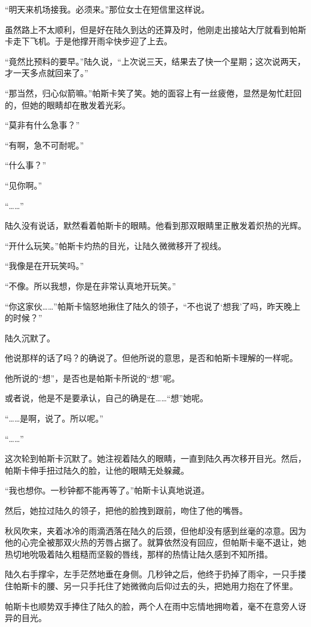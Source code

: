 “明天来机场接我。必须来。”那位女士在短信里这样说。

虽然路上不太顺利，但是好在陆久到达的还算及时，他刚走出接站大厅就看到帕斯卡走下飞机。于是他撑开雨伞快步迎了上去。

“竟然比预料的要早。”陆久说，“上次说三天，结果去了快一个星期；这次说两天，才一天多点就回来了。”

“那当然，归心似箭嘛。”帕斯卡笑了笑。她的面容上有一丝疲倦，显然是匆忙赶回的，但她的眼睛却在散发着光彩。

“莫非有什么急事？”

“有啊，急不可耐呢。”

“什么事？”

“见你啊。”

“……”

陆久没有说话，默然看着帕斯卡的眼睛。他看到那双眼睛里正散发着炽热的光辉。

“开什么玩笑。”帕斯卡灼热的目光，让陆久微微移开了视线。

“我像是在开玩笑吗。”

“不像。所以我想，你是在非常认真地开玩笑。”

“你这家伙……”帕斯卡恼怒地揪住了陆久的领子，“不也说了‘想我’了吗，昨天晚上的时候？”

陆久沉默了。

他说那样的话了吗？的确说了。但他所说的意思，是否和帕斯卡理解的一样呢。

他所说的“想”，是否也是帕斯卡所说的“想”呢。

或者说，他是不是要承认，自己的确是在……“想”她呢。

“……是啊，说了。所以呢。”

“……”

这次轮到帕斯卡沉默了。她注视着陆久的眼睛，一直到陆久再次移开目光。然后，帕斯卡伸手扭过陆久的脸，让他的眼睛无处躲藏。

“我也想你。一秒钟都不能再等了。”帕斯卡认真地说道。

然后，她拉过陆久的领子，把他的脸拽到跟前，吻住了他的嘴唇。

秋风吹来，夹着冰冷的雨滴洒落在陆久的后颈，但他却没有感到丝毫的凉意。因为他的心完全被那双火热的芳唇占据了。就算依然没有回应，但帕斯卡毫不退让，她热切地吮吸着陆久粗糙而坚毅的唇线，那样的热情让陆久感到不知所措。

陆久右手撑伞，左手茫然地垂在身侧。几秒钟之后，他终于扔掉了雨伞，一只手搂住帕斯卡的腰、另一只手托住了她微微向后仰过去的头，把她用力抱在了怀里。

帕斯卡也顺势双手捧住了陆久的脸，两个人在雨中忘情地拥吻着，毫不在意旁人讶异的目光。


